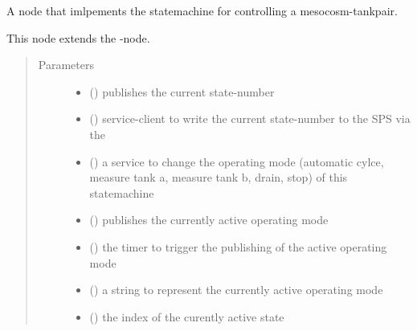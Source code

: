 \documentclass[a4paper,12pt,english]{article}
\begin{document}
\begin{fulllineitems}
\label{\detokenize{meso_control_pkg:meso_control_pkg.meso_state_machine.MesoStateMachine}}
A node that imlpements the statemachine for controlling a mesocosm-tankpair.

This node extends the -node.
\begin{quote}\begin{description}
\item[{Parameters}] \leavevmode\begin{itemize}
\item {} 
 () \textendash{} publishes the current state-number

\item {} 
 () \textendash{} service-client to write the current state-number to the SPS via
the 

\item {} 
 () \textendash{} a service to change the operating mode (automatic cylce, measure
tank a, measure tank b, drain, stop) of this statemachine

\item {} 
 () \textendash{} publishes the currently active operating mode

\item {} 
 () \textendash{} the timer to trigger the publishing of the active operating mode

\item {} 
 () \textendash{} a string to represent the currently active operating mode

\item {} 
 () \textendash{} the index of the curently active state

\end{itemize}

\end{description}\end{quote}

\end{fulllineitems}
\end{document}
